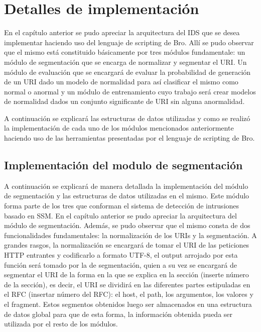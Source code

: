 \chapter{Detalles de implementación}

En el capítulo anterior se pudo apreciar la arquitectura del IDS que se desea implementar haciendo uso del lenguaje de scripting de Bro. Allí se pudo observar que el mismo está constituido básicamente por tres módulos fundamentale: un módulo de segmentación que se encarga de normalizar y segmentar el URI. Un módulo de evaluación que se encargará de evaluar la probabilidad de generación de un URI dado un modelo de normalidad para así clasificar el mismo como normal o anormal y un módulo de entrenamiento cuyo trabajo será crear modelos de normalidad dados un conjunto significante de URI sin alguna anormalidad.

A continuación se explicará las estructuras de datos utilizadas y como se realizó la implementación de cada uno de los módulos mencionados anteriormente haciendo uso de las herramientas presentadas por el lenguaje de scripting de Bro.

\label{capitulo4}
\section{Implementación del modulo de segmentación}

A continuación se explicará de manera detallada la implementación del módulo de segmentación y las estructuras de datos utilizadas en el mismo. Este módulo forma parte de los tres que conforman el sistema de detección de intrusiones basado en SSM. En el capítulo anterior se pudo apreciar la arquitectura del módulo de segmentación. Además, se pudo observar que el mismo consta de dos funcionalidades fundamentales: la normalización de los URIs y la segmentación. A grandes rasgos, la normalización se encargará de tomar el URI de las peticiones HTTP entrantes y codificarlo a formato UTF-8, el output arrojado por esta función será tomado por la de segmentación, quien a su vez se encargará de segmentar el URI de la forma en la que se explica en la sección (inserte número de la sección), es decir, el URI se dividirá en las diferentes partes estipuladas en el RFC (insertar número del RFC): el host, el path, los argumentos, los valores y el fragment. Estos segmentos obtenidos luego ser almacenados en una estructura de datos global para que de esta forma, la información obtenida pueda ser utilizada por el resto de los módulos.

